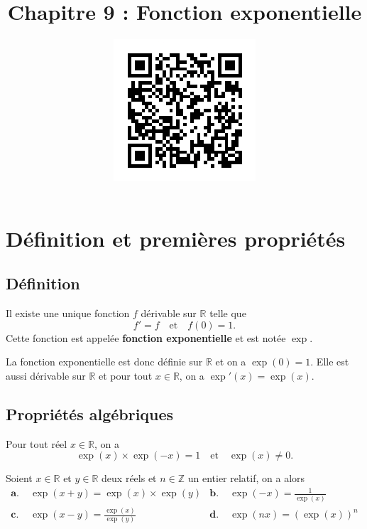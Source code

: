 \documentclass[11pt]{article}
\title{\vspace{-15mm}Chapitre 9 : Fonction exponentielle}
\date{\vspace{-14mm}
\href{https://erou.forge.aeif.fr/spe-1e/expo.html}{
  \includegraphics[scale=.6]{qrcode.png}}
\vspace{-14mm}}
\author{}
\begin{document}
\maketitle\thispagestyle{fancy}
%

\section{Définition et premières propriétés}
\subsection{Définition}
\begin{thmadm}
  Il existe une unique fonction $f$ dérivable sur $\mathbb{R}$ telle que
  \[
    f' = f\quad\text{et}\quad f(0)=1.
  \]
  Cette fonction est appelée \textbf{fonction exponentielle} et est notée
  $\exp$.
\end{thmadm}
\begin{rmq}
  La fonction exponentielle est donc définie sur $\mathbb{R}$ et on a
  $\exp(0)=1$. Elle est aussi dérivable sur $\mathbb{R}$ et pour tout
  $x\in\mathbb{R}$, on a $\exp'(x)=\exp(x)$.
\end{rmq}

\subsection{Propriétés algébriques}
\begin{prop}
  Pour tout réel $x\in\mathbb{R}$, on a
  \[
    \exp(x)\times\exp(-x)=1\quad\text{et}\quad\exp(x)\neq0.
  \]
\end{prop}
\begin{prop}
  Soient $x\in\mathbb{R}$ et $y\in\mathbb{R}$ deux réels et $n\in\mathbb{Z}$ un
  entier relatif, on a alors
  \begin{align*}
    \textbf{a.}\;& \exp(x+y) = \exp(x)\times\exp(y) &
    \textbf{b.}\;& \exp(-x) = \frac{1}{\exp(x)} \\
    \textbf{c.}\;& \exp(x-y) = \frac{\exp(x)}{\exp(y)} &
    \textbf{d.}\;& \exp(nx) = (\exp(x))^n
  \end{align*}
\end{prop}
\end{document}
